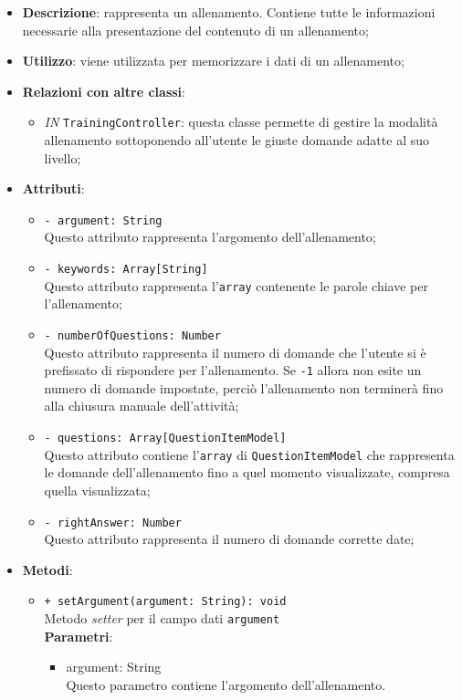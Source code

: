 		\begin{itemize}
			\item \textbf{Descrizione}: rappresenta un allenamento. Contiene tutte le informazioni necessarie alla
			presentazione del contenuto di un allenamento;
			\item \textbf{Utilizzo}: viene utilizzata per memorizzare i dati di un allenamento;
			\item \textbf{Relazioni con altre classi}: 
			\begin{itemize}
				\item \textit{IN} \texttt{TrainingController}: questa classe permette di gestire la modalità allenamento sottoponendo all'utente le giuste domande adatte al suo livello;
			\end{itemize}
			\item \textbf{Attributi}: 
			\begin{itemize}
				\item \texttt{- argument: String}\\
				Questo attributo rappresenta l'argomento dell'allenamento;
				\item \texttt{- keywords: Array[String]}\\
				Questo attributo rappresenta l'\texttt{array} contenente le parole chiave per l'allenamento;
				\item \texttt{- numberOfQuestions: Number}\\
				Questo attributo rappresenta il numero di domande che l'utente si è prefissato di rispondere per l'allenamento. Se \texttt{-1} allora non esite un numero di domande impostate, perciò l'allenamento non terminerà fino alla chiusura manuale dell'attività;
				\item \texttt{- questions: Array[QuestionItemModel]}\\
				Questo attributo contiene l'\texttt{array} di \texttt{QuestionItemModel} che rappresenta le domande dell'allenamento fino a quel momento visualizzate, compresa quella visualizzata;
				\item \texttt{- rightAnswer: Number}\\
				Questo attributo rappresenta il numero di domande corrette date;
			\end{itemize}
			\item \textbf{Metodi}: 
			\begin{itemize}
				\item \texttt{+ setArgument(argument: String): void} \\
				Metodo \textit{setter} per il campo dati \texttt{argument}\\
				\textbf{Parametri}:
				\begin{itemize}
					\item {argument: String}\\
					Questo parametro contiene l'argomento dell'allenamento.
				\end{itemize}
				

\end{itemize}
\end{itemize}
